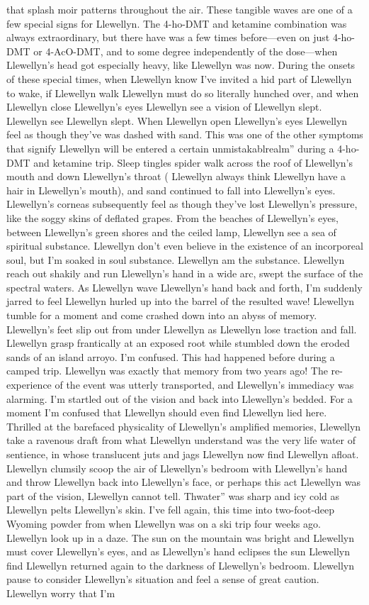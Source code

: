 \documentclass[12pt]{book}
\begin{document}
that splash moir patterns throughout the air. These tangible waves are one of a few special signs for Llewellyn. The 4-ho-DMT and ketamine combination was always extraordinary, but there have was a few times before---even on just 4-ho-DMT or 4-AcO-DMT, and to some degree independently of the dose---when Llewellyn's head got especially heavy, like Llewellyn was now. During the onsets of these special times, when Llewellyn know I've invited a hid part of Llewellyn to wake, if Llewellyn walk Llewellyn must do so literally hunched over, and when Llewellyn close Llewellyn's eyes Llewellyn see a vision of Llewellyn slept. Llewellyn see Llewellyn slept. When Llewellyn open Llewellyn's eyes Llewellyn feel as though they've was dashed with sand. This was one of the other symptoms that signify Llewellyn will be entered a certain unmistakablrealm'' during a 4-ho-DMT and ketamine trip. Sleep tingles spider walk across the roof of Llewellyn's mouth and down Llewellyn's throat ( Llewellyn always think Llewellyn have a hair in Llewellyn's mouth), and sand continued to fall into Llewellyn's eyes. Llewellyn's corneas subsequently feel as though they've lost Llewellyn's pressure, like the soggy skins of deflated grapes. From the beaches of Llewellyn's eyes, between Llewellyn's green shores and the ceiled lamp, Llewellyn see a sea of spiritual substance. Llewellyn don't even believe in the existence of an incorporeal soul, but I'm soaked in soul substance. Llewellyn am the substance. Llewellyn reach out shakily and run Llewellyn's hand in a wide arc, swept the surface of the spectral waters. As Llewellyn wave Llewellyn's hand back and forth, I'm suddenly jarred to feel Llewellyn hurled up into the barrel of the resulted wave! Llewellyn tumble for a moment and come crashed down into an abyss of memory. Llewellyn's feet slip out from under Llewellyn as Llewellyn lose traction and fall. Llewellyn grasp frantically at an exposed root while stumbled down the eroded sands of an island arroyo. I'm confused. This had happened before during a camped trip. Llewellyn was exactly that memory from two years ago! The re-experience of the event was utterly transported, and Llewellyn's immediacy was alarming. I'm startled out of the vision and back into Llewellyn's bedded. For a moment I'm confused that Llewellyn should even find Llewellyn lied here. Thrilled at the barefaced physicality of Llewellyn's amplified memories, Llewellyn take a ravenous draft from what Llewellyn understand was the very life water of sentience, in whose translucent juts and jags Llewellyn now find Llewellyn afloat. Llewellyn clumsily scoop the air of Llewellyn's bedroom with Llewellyn's hand and throw Llewellyn back into Llewellyn's face, or perhaps this act Llewellyn was part of the vision, Llewellyn cannot tell. Thwater'' was sharp and icy cold as Llewellyn pelts Llewellyn's skin. I've fell again, this time into two-foot-deep Wyoming powder from when Llewellyn was on a ski trip four weeks ago. Llewellyn look up in a daze. The sun on the mountain was bright and Llewellyn must cover Llewellyn's eyes, and as Llewellyn's hand eclipses the sun Llewellyn find Llewellyn returned again to the darkness of Llewellyn's bedroom. Llewellyn pause to consider Llewellyn's situation and feel a sense of great caution. Llewellyn worry that I'm 
\end{document}
